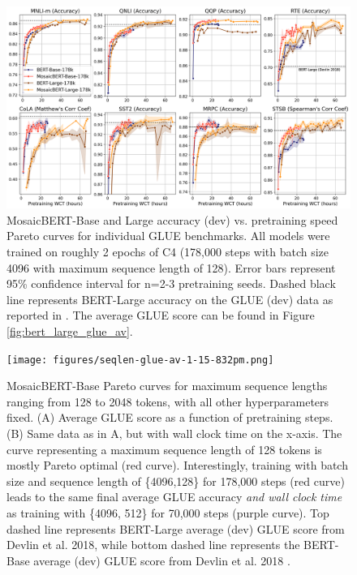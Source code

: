 \begin{figure}
    \centering
    \includegraphics[width=1\textwidth]{figures/bert-large-individual-glue-12-28-145pm.png}
    \caption{MosaicBERT-Base and Large accuracy (dev) vs. pretraining speed Pareto curves for individual GLUE benchmarks. All models were trained on roughly 2 epochs of C4 (178,000 steps with batch size 4096 with maximum sequence length of 128). Error bars represent 95\% confidence interval for n=2-3 pretraining seeds. Dashed black line represents BERT-Large accuracy on the GLUE (dev) data as reported in \cite{liu2019roberta}. The average GLUE score can be found in Figure \ref{fig:bert_large_glue_av}.}
    \label{fig:bert_large_glue_individual}
\end{figure}






\begin{figure}[!ht]
    \centering
    \texttt{[image: figures/seqlen-glue-av-1-15-832pm.png]}
    \caption{MosaicBERT-Base Pareto curves for maximum sequence lengths ranging from 128 to 2048 tokens, with all other hyperparameters fixed. (A) Average GLUE score as a function of pretraining steps. (B) Same data as in A, but with wall clock time on the x-axis. The curve representing a maximum sequence length of 128 tokens is mostly Pareto optimal (red curve). Interestingly, training with batch size and sequence length of \{4096,128\} for 178,000 steps (red curve) leads to the same final average GLUE accuracy \textit{and wall clock time} as training with \{4096, 512\} for 70,000 steps (purple curve). Top dashed line represents BERT-Large average (dev) GLUE score from Devlin et al. 2018, while bottom dashed line represents the BERT-Base average (dev) GLUE score from Devlin et al. 2018 \cite{devlin2018bert}.}
    \label{fig:mosaicbert-base-seqlen}
\end{figure}









